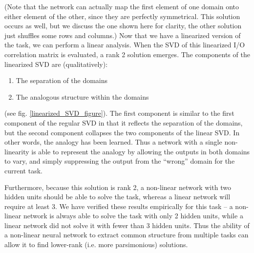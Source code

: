 \documentclass[10pt,letterpaper]{article}
\begin{document}
(Note that the network can actually map the first element of one domain onto either element of the other, since they are perfectly symmetrical. This solution occurs as well, but we discuss the one shown here for clarity, the other solution just shuffles some rows and columns.) Now that we have a linearized version of the task, we can perform a linear analysis. When the SVD of this linearized I/O correlation matrix is evaluated, a rank 2 solution emerges. The components of the linearized SVD are (qualitatively): \begin{enumerate}
\itemsep0em
\item The separation of the domains
\item The analogous structure within the domains
\end{enumerate}
(see fig. \ref{linearized_SVD_figure}). The first component is similar to the first component of the regular SVD in that it reflects the separation of the domains, but the second component collapses the two components of the linear SVD. In other words, the analogy has been learned. Thus a network with a single non-linearity is able to represent the analogy by allowing the outputs in both domains to vary, and simply suppressing the output from the ``wrong'' domain for the current task.\par
Furthermore, because this solution is rank 2, a non-linear network with two hidden units should be able to solve the task, whereas a linear network will require at least 3. We have verified these results empirically for this task -- a non-linear network is always able to solve the task with only 2 hidden units, while a linear network did not solve it with fewer than 3 hidden units. Thus the ability of a non-linear neural network to extract common structure from multiple tasks can allow it to find lower-rank (i.e. more parsimonious) solutions. 
\end{document}
